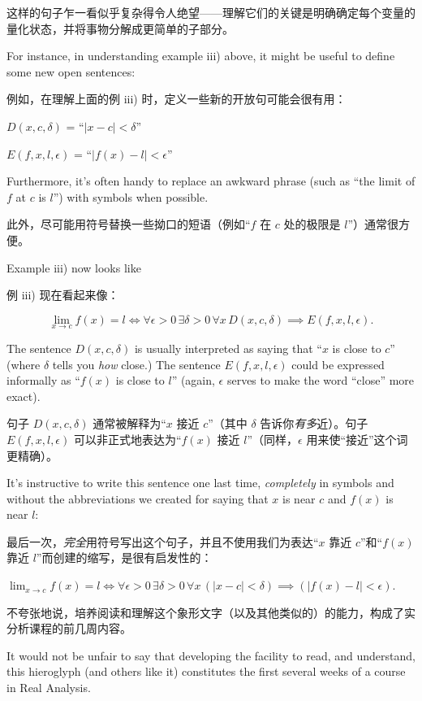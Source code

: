 这样的句子乍一看似乎复杂得令人绝望——理解它们的关键是明确确定每个变量的量化状态，并将事物分解成更简单的子部分。

For instance, in understanding example iii) above, it might be
useful to define some new open sentences:

例如，在理解上面的例 iii) 时，定义一些新的开放句可能会很有用：

$D(x,c,\delta)$ = ``$|x-c| < \delta$''

$E(f,x,l,\epsilon)$ = ``$|f(x)-l| < \epsilon$''

\noindent Furthermore, it's often handy to replace an awkward phrase (such as 
``the limit of $f$ at $c$ is $l$'') with symbols when possible.

\noindent 此外，尽可能用符号替换一些拗口的短语（例如“$f$ 在 $c$ 处的极限是 $l$”）通常很方便。

Example iii) now looks like 

例 iii) 现在看起来像：

\[ \lim_{x\rightarrow c}f(x) = l \iff \forall \epsilon>0 \, \exists \delta>0 \, \forall x \, D(x,c,\delta) \implies E(f,x,l,\epsilon).
\]

The sentence $D(x,c,\delta)$ is usually interpreted as saying that
``$x$ is close to $c$'' (where $\delta$ tells you {\em how} close.)
The sentence $E(f,x,l,\epsilon)$ could be expressed informally as
``$f(x)$ is close to $l$'' (again, $\epsilon$ serves to make the 
word ``close'' more exact).

句子 $D(x,c,\delta)$ 通常被解释为“$x$ 接近 $c$”（其中 $\delta$ 告诉你{\em 有多}近）。句子 $E(f,x,l,\epsilon)$ 可以非正式地表达为“$f(x)$ 接近 $l$”（同样，$\epsilon$ 用来使“接近”这个词更精确）。

It's instructive to write this sentence one last time, {\em completely}
in symbols and without the abbreviations we created for saying
that $x$ is near $c$ and $f(x)$ is near $l$:

最后一次，{\em 完全}用符号写出这个句子，并且不使用我们为表达“$x$ 靠近 $c$”和“$f(x)$ 靠近 $l$”而创建的缩写，是很有启发性的：


$\displaystyle \lim_{x\rightarrow c}f(x) = l \iff \forall \epsilon>0 \, \exists 
\delta>0 \, \forall x \, (|x-c| < \delta) \implies (|f(x)-l| < \epsilon) $.

不夸张地说，培养阅读和理解这个象形文字（以及其他类似的）的能力，构成了实分析课程的前几周内容。

It would not be unfair to say that developing the facility to read,
and understand, this hieroglyph (and others like it) constitutes the 
first several weeks of a course in Real Analysis.

